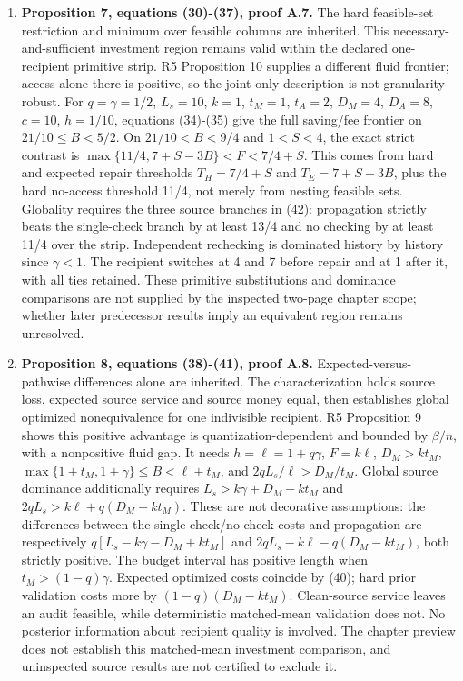 \documentclass[
  11pt,
  a4paper,
]{article}
\begin{document}
\begin{enumerate}
  binary fault, independent first check and conditional propagation, not
  from a Bayesian artifact pass. Its recipient adoption comparison uses
  service demands \(t_M,t_A\) and the independent recipient's optional
  production saving. Its conditional matched-mean expected-resource null
  is retained. No first multi-round verification or constrained-MDP
  claim is made.
\item
  \textbf{Proposition 7, equations (30)-(37), proof A.7.} The hard
  feasible-set restriction and minimum over feasible columns are
  inherited. This necessary-and-sufficient investment region remains
  valid within the declared one-recipient primitive strip. R5
  Proposition 10 supplies a different fluid frontier; access alone there
  is positive, so the joint-only description is not granularity-robust.
  For \(q=\gamma=1/2\), \(L_s=10\), \(k=1\), \(t_M=1\), \(t_A=2\),
  \(D_M=4\), \(D_A=8\), \(c=10\), \(h=1/10\), equations (34)-(35) give
  the full saving/fee frontier on \(21/10\leq B<5/2\). On
  \(21/10<B<9/4\) and \(1<S<4\), the exact strict contrast is
  \(\max\{11/4,7+S-3B\}<F<7/4+S\). This comes from hard and expected
  repair thresholds \(T_H=7/4+S\) and \(T_E=7+S-3B\), plus the hard
  no-access threshold 11/4, not merely from nesting feasible sets.
  Globality requires the three source branches in (42): propagation
  strictly beats the single-check branch by at least 13/4 and no
  checking by at least 11/4 over the strip. Independent rechecking is
  dominated history by history since \(\gamma<1\). The recipient
  switches at 4 and 7 before repair and at 1 after it, with all ties
  retained. These primitive substitutions and dominance comparisons are
  not supplied by the inspected two-page chapter scope; whether later
  predecessor results imply an equivalent region remains unresolved.
\item
  \textbf{Proposition 8, equations (38)-(41), proof A.8.}
  Expected-versus-pathwise differences alone are inherited. The
  characterization holds source loss, expected source service and source
  money equal, then establishes global optimized nonequivalence for one
  indivisible recipient. R5 Proposition 9 shows this positive advantage
  is quantization-dependent and bounded by \(\beta/n\), with a
  nonpositive fluid gap. It needs \(h=\ell=1+q\gamma\), \(F=k\ell\),
  \(D_M>kt_M\), \(\max\{1+t_M,1+\gamma\}\leq B<\ell+t_M\), and
  \(2qL_s/\ell>D_M/t_M\). Global source dominance additionally requires
  \(L_s>k\gamma+D_M-kt_M\) and \(2qL_s>k\ell+q(D_M-kt_M)\). These are
  not decorative assumptions: the differences between the
  single-check/no-check costs and propagation are respectively
  \(q[L_s-k\gamma-D_M+kt_M]\) and \(2qL_s-k\ell-q(D_M-kt_M)\), both
  strictly positive. The budget interval has positive length when
  \(t_M>(1-q)\gamma\). Expected optimized costs coincide by (40); hard
  prior validation costs more by \((1-q)(D_M-kt_M)\). Clean-source
  service leaves an audit feasible, while deterministic matched-mean
  validation does not. No posterior information about recipient quality
  is involved. The chapter preview does not establish this matched-mean
  investment comparison, and uninspected source results are not
  certified to exclude it.
\end{enumerate}
\end{document}
